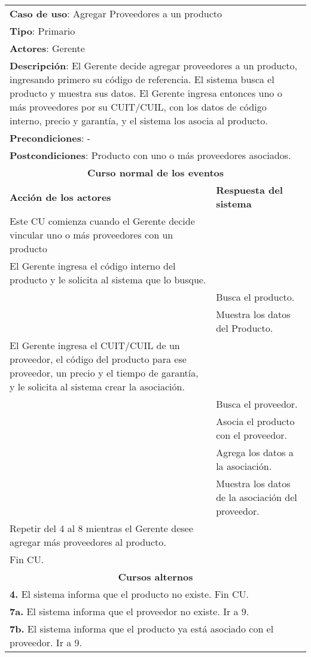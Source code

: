 \begin{longtable}{ |p{8cm}|p{8cm}| }
		\hline
		\multicolumn{2}{|p{16cm}|}{\textbf{Caso de uso}: Agregar Proveedores a un producto }\\
		\multicolumn{2}{|p{16cm}|}{\textbf{Tipo}: Primario }\\
		\multicolumn{2}{|p{16cm}|}{\textbf{Actores}: Gerente }\\
		\multicolumn{2}{|p{16cm}|}{\textbf{Descripción}: El Gerente decide agregar proveedores a un producto, ingresando primero su código de referencia. El sistema busca el producto y muestra sus datos. El Gerente ingresa entonces uno o más proveedores por su CUIT/CUIL, con los datos de código interno, precio y garantía, y el sistema los asocia al producto. }\\
		\multicolumn{2}{|p{16cm}|}{\textbf{Precondiciones}: -}\\
		\multicolumn{2}{|p{16cm}|}{\textbf{Postcondiciones}: Producto con uno o más proveedores asociados. }\\
		\hline
		\multicolumn{2}{|c|}{\textbf{Curso normal de los eventos}}\\
		\hline
		\textbf{Acción de los actores} & \textbf{Respuesta del sistema}\\
		\hline
			\inc Este CU comienza cuando el Gerente decide vincular uno o más proveedores con un producto & \\
			\hline
			\inc El Gerente ingresa el código interno del producto y le solicita al sistema que lo busque. &   \\
			\hline
			& \inc Busca el producto. \\
			\hline
			& \inc Muestra los datos del Producto. \\
			\hline
			\inc El Gerente ingresa el CUIT/CUIL de un proveedor, el código del producto para ese proveedor, un precio y el tiempo de garantía, y le solicita al sistema crear la asociación. &  \\
			\hline
			& \inc Busca el proveedor. \\
			\hline
			& \inc Asocia el producto con el proveedor. \\
			\hline
			& \inc Agrega los datos a la asociación. \\
			\hline
			& \inc Muestra los datos de la asociación del proveedor. \\
			\hline
			\inc Repetir del 4 al 8 mientras el Gerente desee agregar más proveedores al producto. &\\
			\hline
			\inc Fin CU. & \\
		\hline
		\multicolumn{2}{|c|}{\textbf{Cursos alternos}}\\
		\hline
		\multicolumn{2}{|p{16cm}|}{\textbf{4. }El sistema informa que el producto no existe. Fin CU. }\\
		\hline
		\multicolumn{2}{|p{16cm}|}{\textbf{7a. }El sistema informa que el proveedor no existe. Ir a 9. }\\
		\hline
		\multicolumn{2}{|p{16cm}|}{\textbf{7b. }El sistema informa que el producto ya está asociado con el proveedor. Ir a 9. }\\
		\hline
	\end{longtable}
